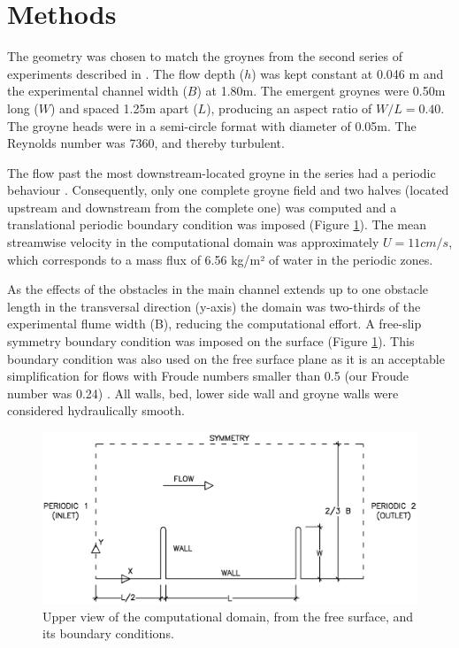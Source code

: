 \section{Methods}
The geometry was chosen to match the groynes from the second series of experiments described in \textcite{weitbrecht2004}. The flow depth ($h$) was kept constant at 0.046 m and the experimental channel width ($B$) at 1.80m. The emergent groynes were 0.50m long ($W$) and spaced 1.25m apart ($L$), producing an aspect ratio of $W/L = 0.40$. The groyne heads were in a semi-circle format with diameter of 0.05m. The Reynolds number was 7360, and thereby turbulent.

The flow past the most downstream-located groyne in the series had a periodic behaviour \cite{Hinterberger2007}. Consequently, only one complete groyne field and two halves (located upstream and downstream from the complete one) was computed and a translational periodic boundary condition was imposed (Figure \ref{fig:art1:numericalDomainArticle1}). The mean streamwise velocity in the computational domain was approximately $U = 11 cm/s$, which corresponds to a mass flux of 6.56 kg/m² of water in the periodic zones. 

As the effects of the obstacles in the main channel extends up to one obstacle length in the transversal direction (y-axis) \cite{Brevis2014} the domain was two-thirds of the experimental flume width (B), reducing the computational effort. A free-slip symmetry boundary condition was imposed on the surface (Figure \ref{fig:art1:numericalDomainArticle1}). This boundary condition was also used on the free surface plane as it is an acceptable simplification for flows with Froude numbers smaller than 0.5 (our Froude number was 0.24) \cite{alfrink1983}. All walls, bed, lower side wall and groyne walls were considered hydraulically smooth.

\begin{figure}[!ht]
\centering
\includegraphics[width=\linewidth]{../images/art1/imgMassExchange1.png}
\caption{Upper view of the computational domain, from the free surface, and its boundary conditions.}
\label{fig:art1:numericalDomainArticle1}
\end{figure}

